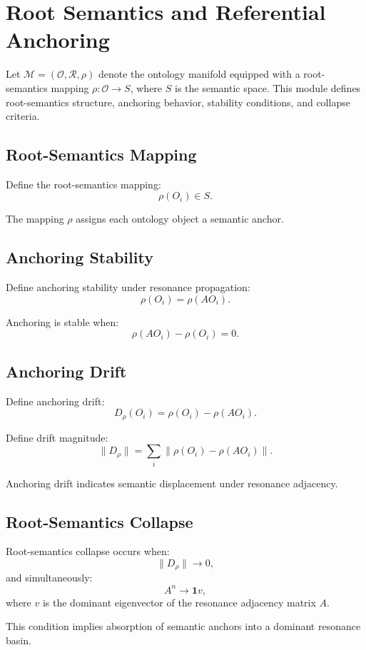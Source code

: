 \section{Root Semantics and Referential Anchoring}

Let $\mathcal{M} = (\mathcal{O}, \mathcal{R}, \rho)$ denote the ontology
manifold equipped with a root-semantics mapping $\rho : \mathcal{O} \to S$,
where $S$ is the semantic space. This module defines root-semantics
structure, anchoring behavior, stability conditions, and collapse criteria.

\subsection{Root-Semantics Mapping}

Define the root-semantics mapping:
\[
\rho(O_i) \in S.
\]

The mapping $\rho$ assigns each ontology object a semantic anchor.

\subsection{Anchoring Stability}

Define anchoring stability under resonance propagation:
\[
\rho(O_i) = \rho(A O_i).
\]

Anchoring is stable when:
\[
\rho(A O_i) - \rho(O_i) = 0.
\]

\subsection{Anchoring Drift}

Define anchoring drift:
\[
D_{\rho}(O_i) = \rho(O_i) - \rho(A O_i).
\]

Define drift magnitude:
\[
\|D_{\rho}\| = \sum_i \| \rho(O_i) - \rho(A O_i) \|.
\]

Anchoring drift indicates semantic displacement under resonance adjacency.

\subsection{Root-Semantics Collapse}

Root-semantics collapse occurs when:
\[
\|D_{\rho}\| \to 0,
\]
and simultaneously:
\[
A^n \to \mathbf{1} v,
\]
where $v$ is the dominant eigenvector of the resonance adjacency matrix $A$.

This condition implies absorption of semantic anchors into a dominant
resonance basin.

